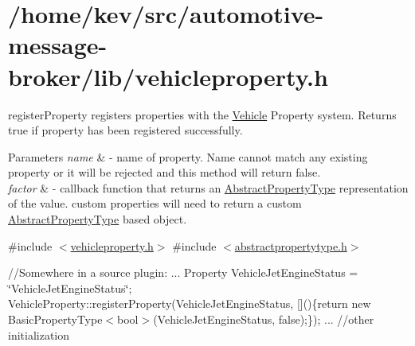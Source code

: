 \hypertarget{_2home_2kev_2src_2automotive-message-broker_2lib_2vehicleproperty_8h-example}{\section{/home/kev/src/automotive-\/message-\/broker/lib/vehicleproperty.\-h}
}
register\-Property registers properties with the \hyperlink{namespaceVehicle}{Vehicle} Property system. Returns true if property has been registered successfully. 
\begin{DoxyParams}{Parameters}
{\em name} & -\/ name of property. Name cannot match any existing property or it will be rejected and this method will return false. \\
\hline
{\em factor} & -\/ callback function that returns an \hyperlink{classAbstractPropertyType}{Abstract\-Property\-Type} representation of the value. custom properties will need to return a custom \hyperlink{classAbstractPropertyType}{Abstract\-Property\-Type} based object.\\
\hline
\end{DoxyParams}
\#include $<$\hyperlink{vehicleproperty_8h_source}{vehicleproperty.\-h}$>$ \#include $<$\hyperlink{abstractpropertytype_8h_source}{abstractpropertytype.\-h}$>$

//\-Somewhere in a source plugin\-: ... Property Vehicle\-Jet\-Engine\-Status = \char`\"{}\-Vehicle\-Jet\-Engine\-Status\char`\"{}; Vehicle\-Property\-::register\-Property(Vehicle\-Jet\-Engine\-Status, \mbox{[}\mbox{]}()\{return new Basic\-Property\-Type$<$bool$>$(\-Vehicle\-Jet\-Engine\-Status, false);\}); ... //other initialization


\begin{DoxyCodeInclude}
\end{DoxyCodeInclude}
 